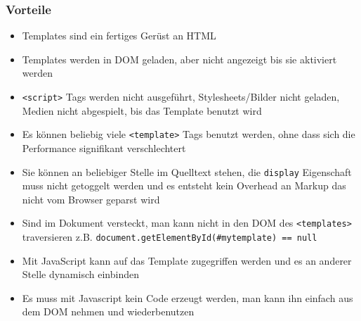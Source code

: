 \begin{Shaded}
\begin{Highlighting}[]
 \OperatorTok{=} \NormalTok{(}\NormalTok{)}\OperatorTok{;}             
 \OperatorTok{=} \NormalTok{(}\OperatorTok{,} \NormalTok{)}\OperatorTok{;}  
\OperatorTok{;}                         
\end{Highlighting}
\end{Shaded}

\subsubsection{Vorteile}\label{vorteile}

\begin{itemize}
\tightlist
\item
  Templates sind ein fertiges Gerüst an HTML
\item
  Templates werden in DOM geladen, aber nicht angezeigt bis sie
  aktiviert werden
\item
  \texttt{\textless{}script\textgreater{}} Tags werden nicht ausgeführt,
  Stylesheets/Bilder nicht geladen, Medien nicht abgespielt, bis das
  Template benutzt wird
\item
  Es können beliebig viele \texttt{\textless{}template\textgreater{}}
  Tags benutzt werden, ohne dass sich die Performance signifikant
  verschlechtert
\item
  Sie können an beliebiger Stelle im Quelltext stehen, die
  \texttt{display} Eigenschaft muss nicht getoggelt werden und es
  entsteht kein Overhead an Markup das nicht vom Browser geparst wird
\item
  Sind im Dokument versteckt, man kann nicht in den DOM des
  \texttt{\textless{}templates\textgreater{}} traversieren z.B.
  \texttt{document.getElementById(\textquotesingle{}\#mytemplate\textquotesingle{})\ ==\ null}
\item
  Mit JavaScript kann auf das Template zugegriffen werden und es an
  anderer Stelle dynamisch einbinden
\item
  Es muss mit Javascript kein Code erzeugt werden, man kann ihn einfach
  aus dem DOM nehmen und wiederbenutzen
\end{itemize}

